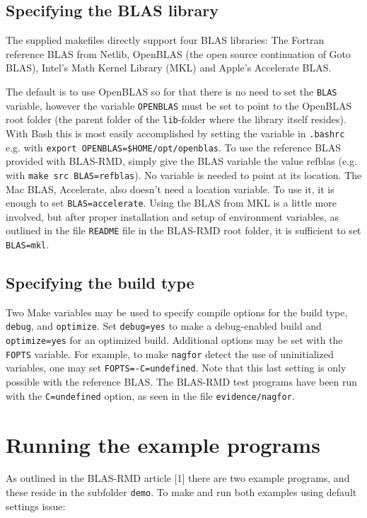 \documentclass[a4paper]{article}
\begin{document}
\subsection{Specifying the BLAS library}
The supplied makefiles directly support four BLAS libraries: The Fortran
reference BLAS from Netlib, OpenBLAS (the open source continuation of Goto
BLAS), Intel's Math Kernel Library (MKL) and Apple's Accelerate BLAS.

The default is to use OpenBLAS so for that there is no need to set the
\texttt{BLAS} variable, however the variable \texttt{OPENBLAS} must be set to
point to the OpenBLAS root folder (the parent folder of the \texttt{lib}-folder where the
library itself resides). With Bash this is most easily accomplished by setting
the variable in \texttt{.bashrc} e.g. with \texttt{export
  OPENBLAS=\$HOME/opt/openblas}. To use the reference BLAS provided with
BLAS-RMD, simply give the BLAS variable the value refblas (e.g. with
\texttt{make src BLAS=refblas}). No variable is needed to point at its location.
The Mac BLAS, Accelerate, also doesn't need a location variable. To use it, it
is enough to set \texttt{BLAS=accelerate}. Using the BLAS from MKL is a little
more involved, but after proper installation and setup of environment variables,
as outlined in the file \texttt{README} file in the BLAS-RMD root folder, it is
sufficient to set \texttt{BLAS=mkl}.

\subsection{Specifying the build type}
Two Make variables may be used to specify compile options for the build type,
\texttt{debug}, and \texttt{optimize}. Set \texttt{debug=yes} to make a
debug-enabled build and \texttt{optimize=yes} for an optimized build. Additional
options may be set with the \texttt{FOPTS} variable. For example, to make
\texttt{nagfor} detect the use of uninitialized variables, one may set
\texttt{FOPTS=-C=undefined}. Note that this last setting is only possible with
the reference BLAS. The BLAS-RMD test programs have been run with the
\texttt{C=undefined} option, as seen in the file \texttt{evidence/nagfor}.

\section{Running the example programs}
As outlined in the BLAS-RMD article [1] there are two example programs, and these
reside in the subfolder \texttt{demo}. To make and run both examples using
default settings issue:
\end{document}

